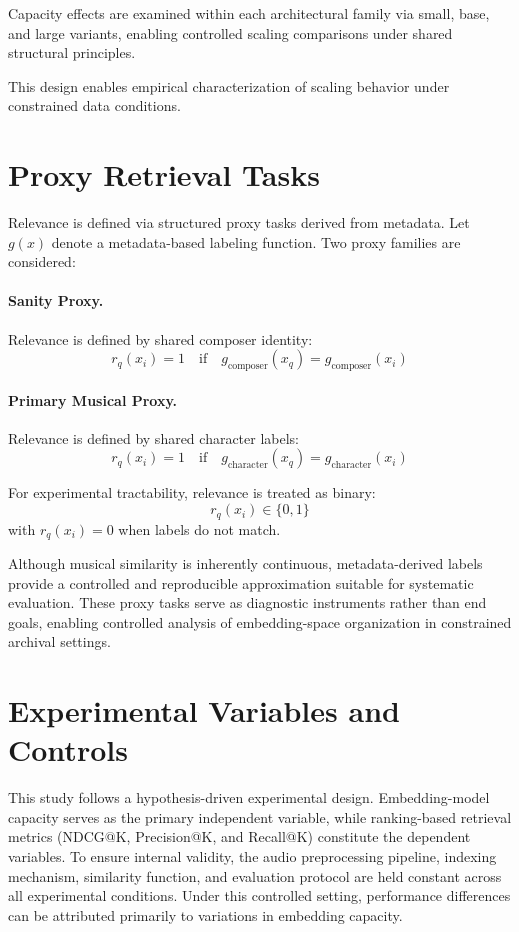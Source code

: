 Capacity effects are examined within each architectural family via small, base, and large variants, enabling controlled scaling comparisons under shared structural principles.

This design enables empirical characterization of scaling behavior under constrained data conditions.

\section{Proxy Retrieval Tasks}

Relevance is defined via structured proxy tasks derived from metadata.
Let $g(x)$ denote a metadata-based labeling function.
Two proxy families are considered:

\paragraph{Sanity Proxy.}
Relevance is defined by shared composer identity:
\[
r_q(x_i) = 1 \quad \text{if} \quad g_{\text{composer}}(x_q) = g_{\text{composer}}(x_i)
\]

\paragraph{Primary Musical Proxy.}
Relevance is defined by shared character labels:
\[
r_q(x_i) = 1 \quad \text{if} \quad g_{\text{character}}(x_q) = g_{\text{character}}(x_i)
\]

For experimental tractability, relevance is treated as binary:
\[
r_q(x_i) \in \{0,1\}
\]
with $r_q(x_i)=0$ when labels do not match.

Although musical similarity is inherently continuous, metadata-derived labels provide a controlled and reproducible approximation suitable for systematic evaluation.
These proxy tasks serve as diagnostic instruments rather than end goals, enabling controlled analysis of embedding-space organization in constrained archival settings.


\section{Experimental Variables and Controls}

This study follows a hypothesis-driven experimental design.
Embedding-model capacity serves as the primary independent variable, while ranking-based retrieval metrics (NDCG@K, Precision@K, and Recall@K) constitute the dependent variables.
To ensure internal validity, the audio preprocessing pipeline, indexing mechanism, similarity function, and evaluation protocol are held constant across all experimental conditions.
Under this controlled setting, performance differences can be attributed primarily to variations in embedding capacity.



